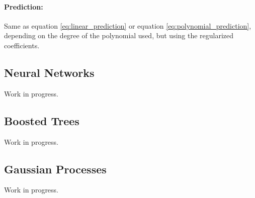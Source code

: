 \documentclass[a4paper, 12pt]{article}
\begin{document}
\paragraph{Prediction:} Same as equation \ref{eq:linear_prediction} or equation \ref{eq:polynomial_prediction}, depending on the degree of the polynomial used, but using the regularized coefficients.


\subsection{Neural Networks}
Work in progress.

\subsection{Boosted Trees}
Work in progress.

\subsection{Gaussian Processes}
Work in progress.
\end{document}

